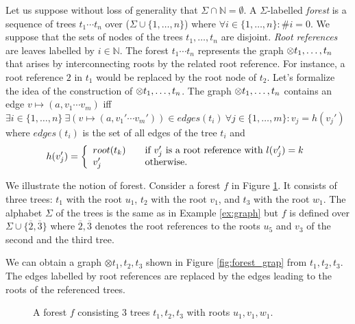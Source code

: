 Let us suppose without loss of generality that $\Sigma \cap \mathbb{N} = \emptyset$.
A $\Sigma$-labelled \emph{forest} is a sequence of trees $t_1 \cdots t_n$ over ($\Sigma \cup \{1,\ldots,n\}$)
where $\forall i \in \{1,\ldots,n\}: \#i = 0$.
We suppose that the sets of nodes of the trees $t_1, \ldots, t_n$ are disjoint.
\emph{Root references} are leaves labelled by $i \in \mathbb{N}$.
The forest $t_1 \cdots t_n$ represents the graph $\otimes t_1, \ldots, t_n$ that arises
by interconnecting roots by the related root reference.
For instance, a root reference $2$ in $t_1$ would be replaced by the root node of $t_2$.
Let's formalize the idea of the construction of $\otimes t_1, \ldots, t_n$.
The graph $\otimes t_1, \ldots, t_n$ contains an edge $v \mapsto (a,v_1 \cdots v_m)$ iff $\exists i \in \{1, \ldots, n\} \ \exists(v \mapsto (a, v_1' \cdots v_m')) \in edges(t_i)
\ \forall j \in \{1,\ldots,m\}: v_j = h(v_j')$ where $edges(t_i)$ is the set of all edges of the tree $t_i$ and
\[ h(v_j') = \left\{
  \begin{array}{l l}
  root(t_k) & \quad \text{if $v_j'$ is a root reference with $l(v_j') = k$}\\
  v_j'   & \quad \text{otherwise.}
  \end{array} \right.\]

\pagebreak
\bexmp
We illustrate the notion of forest.
Consider a forest $f$ in Figure \ref{fig:forest}.
It consists of three trees: $t_1$ with the root $u_1$,
$t_2$ with the root $v_1$, and $t_3$ with the root $w_1$.
The alphabet $\Sigma$ of the trees is the same as in Example \ref{ex:graph} but $f$
is defined over $\Sigma \cup \{\overline{2}, \overline{3}\}$
where $\overline{2}, \overline{3}$ denotes the root references
to the roots $u_5$ and $v_3$ of the second and the third tree.

We can obtain a graph $\otimes t_1,t_2,t_3$ shown in Figure \ref{fig:forest_grap} from $t_1, t_2, t_3$.
The edges labelled by root references are replaced by the edges leading to the roots
of the referenced trees.
	\begin{figure}[bth]
	\begin{center}
		\scalebox{1}
		{
			
			\hspace{0.55cm}
			
			\hspace{0.55cm}
			
		}
		\caption{A forest $f$ consisting 3 trees $t_1, t_2, t_3$ with roots $u_1, v_1, w_1$.}
	  \label{fig:forest}
	\end{center}
	\end{figure}

